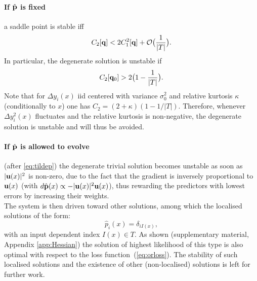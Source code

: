 \paragraph{If $\hat {\bf p}$ is fixed} a saddle point is stable iff
\[
C_2[{\bf q}] < 2C_1^2[{\bf q}]+{\cal O}\bigl(\frac{1}{\vert T\vert}\bigr).
\]
In particular, the degenerate solution is unstable if
\[
C_2[{\bf q}_0] > 2\bigl(1-\frac{1}{\vert T\vert}\bigr).
\]
Note that for $\Delta y_i(x)$ iid centered with variance $\sigma_0^2$ and relative kurtosis $\kappa$ (conditionally to $x$)
one has $C_2 = (2+\kappa)(1-1/\vert T\vert)$. Therefore, whenever $\Delta y_i^2(x)$ fluctuates and the relative kurtosis is non-negative, %
the  degenerate solution is unstable and will thus be avoided.

\paragraph{If $\hat {\bf p}$ is allowed to evolve} (after \cref{eq:tildep}) the degenerate trivial solution becomes unstable as soon as $\vert {\bf u}(x)\vert^2$ is non-zero, due to the fact that the gradient is inversely proportional to ${\bf u}(x)$ (with $d\hat{\bf p}(x)\propto -\vert {\bf u}(x)\vert^2 {\bf u}(x)$), thus rewarding the predictors with lowest errors by increasing their weights. \\

The system is then driven toward other solutions, among which the localised solutions of the form: 
\[
\hat p_i(x) = \delta_{iI(x)},
\]
with an input dependent index $I(x)\in T$. As shown (supplementary material, Appendix \ref{app:Hessian}) the solution of highest likelihood of this type is also optimal with respect to the loss function~(\cref{eq:orloss}). The stability of such localised solutions and the existence of other (non-localised) solutions is left for further work.  



